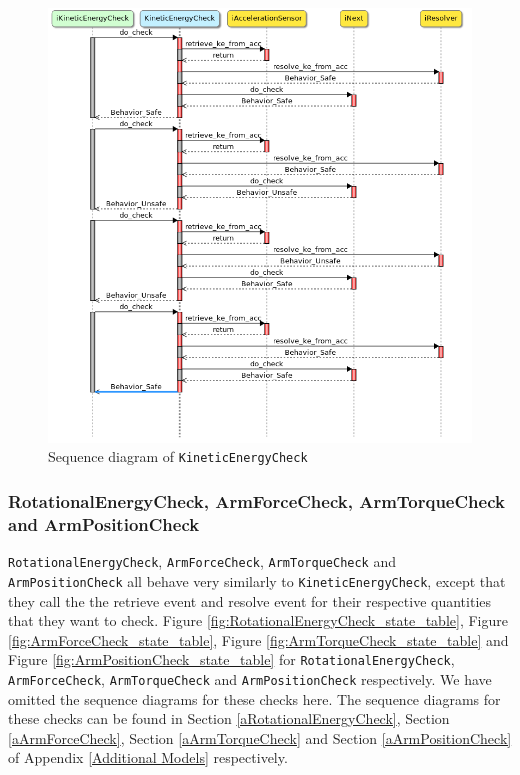 \documentclass[12pt]{scrreprt}
\begin{document}
\begin{figure}[H]
    \centering
    \includegraphics[width=\textwidth]{Figures/results/modelling_figures/KineticEnergyCheck/KineticEnergyCheck_seq.png}
    \caption{Sequence diagram of \texttt{KineticEnergyCheck}}
    \label{fig:kineticenergycheck_seq}
\end{figure}

\subsubsection{RotationalEnergyCheck, ArmForceCheck, ArmTorqueCheck and ArmPositionCheck}
\texttt{RotationalEnergyCheck}, \texttt{ArmForceCheck}, \texttt{ArmTorqueCheck} and \texttt{ArmPositionCheck} all behave very similarly to \texttt{KineticEnergyCheck}, except that they call the the retrieve event and resolve event for their respective quantities that they want to check. Figure \ref{fig:RotationalEnergyCheck_state_table}, Figure \ref{fig:ArmForceCheck_state_table}, Figure \ref{fig:ArmTorqueCheck_state_table} and Figure \ref{fig:ArmPositionCheck_state_table} for \texttt{RotationalEnergyCheck}, \texttt{ArmForceCheck}, \texttt{ArmTorqueCheck} and \texttt{ArmPositionCheck} respectively. We have omitted the sequence diagrams for these checks here. The sequence diagrams for these checks can be found in Section \ref{aRotationalEnergyCheck}, Section \ref{aArmForceCheck}, Section \ref{aArmTorqueCheck} and Section \ref{aArmPositionCheck} of Appendix \ref{Additional Models} respectively.
\end{document}
